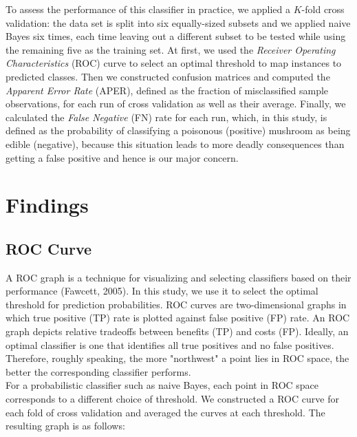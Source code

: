 \documentclass{article}
\begin{document}
\begin{multicols}{2}
To assess the performance of this classifier in practice, we applied a $K$-fold cross validation: the data set is split into six equally-sized subsets and we applied naive Bayes six times, each time leaving out a different subset to be tested while using the remaining five as the training set. At first, we used the \textit{Receiver Operating Characteristics} (ROC) curve to select an optimal threshold to map instances to predicted classes. Then we constructed confusion matrices and computed the \textit{Apparent Error Rate} (APER), defined as the fraction of misclassified sample observations, for each run of cross validation as well as their average. Finally, we calculated the \textit{False Negative} (FN) rate for each run, which, in this study, is defined as the probability of classifying a poisonous (positive) mushroom as being edible (negative), because this situation leads to more deadly consequences than getting a false positive and hence is our major concern.





\section{Findings}
\subsection{ROC Curve}
A ROC graph is a technique for visualizing and selecting classifiers based on their performance (Fawcett, 2005). In this study, we use it to select the optimal threshold for prediction probabilities. ROC curves are two-dimensional graphs in which true positive (TP) rate is plotted against false positive (FP) rate. An ROC graph depicts relative tradeoffs between benefits (TP) and costs (FP). Ideally, an optimal classifier is one that identifies all true positives and no false positives. Therefore, roughly speaking, the more "northwest" a point lies in ROC space, the better the corresponding classifier performs.\\

For a probabilistic classifier such as naive Bayes, each point in ROC space corresponds to a different choice of threshold. We constructed a ROC curve for each fold of cross validation and averaged the curves at each threshold. The resulting graph is as follows:
\begin{center}
\end{center}


\end{multicols}
\end{document}
